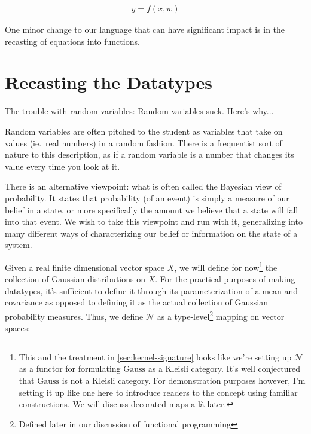 \begin{equation}
    \begin{aligned}
	y = f(x,w)
    \end{aligned}
\end{equation}


One minor change to our language that can have significant impact is in the recasting of equations into functions.

\section{Recasting the Datatypes}
The trouble with random variables:
Random variables suck. Here's why...

Random variables are often pitched to the student as variables that take on values (ie.\ real numbers) in a random fashion.
There is a frequentist sort of nature to this description, as if a random variable is a number that changes its value every time you look at it.

There is an alternative viewpoint: what is often called the Bayesian view of probability.
It states that probability (of an event) is simply a measure of our belief in a state, or more specifically the amount we believe that a state will fall into that event.
We wish to take this viewpoint and run with it, generalizing into many different ways of characterizing our belief or information on the state of a system.

\newcommand{\gaussian}{\mathcal{N}}
\newcommand{\gausscat}{\mathrm{Gauss}}
Given a real finite dimensional vector space $X$, we will define for now\footnote{This and the treatment in \ref{sec:kernel-signature} looks like we're setting up $\gaussian$ as a functor for formulating $\gausscat$ as a Kleisli category. It's well conjectured that $\gausscat$ is not a Kleisli category. For demonstration purposes however, I'm setting it up like one here to introduce readers to the concept using familiar constructions. We will discuss decorated maps a-l\`a \cite{stein2022extended} later.} the collection of Gaussian distributions on $X$.
For the practical purposes of making datatypes, it's sufficient to define it through its parameterization of a mean and covariance as opposed to defining it as the actual collection of Gaussian probability measures.
Thus, we define $\gaussian$ as a type-level\footnote{Defined later in our discussion of functional programming} mapping on vector spaces:

